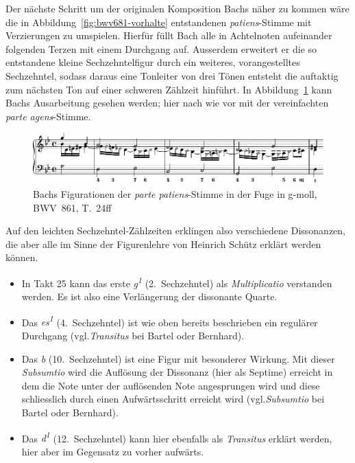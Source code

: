 Der nächste Schritt um der originalen Komposition Bachs näher zu kommen wäre die in Abbildung~\ref{fig:bwv681-vorhalte} entstandenen \emph{patiens}-Stimme mit Verzierungen zu umspielen.
Hierfür füllt Bach alle in Achtelnoten aufeinander folgenden Terzen mit einem Durchgang auf.
Ausserdem erweitert er die so entstandene kleine Sechzehntelfigur durch ein weiteres, vorangestelltes Sechzehntel, sodass daraus eine Tonleiter von drei Tönen entsteht die auftaktig zum nächsten Ton auf einer schweren Zählzeit hinführt.
In Abbildung~\ref{fig:bwv681-patiens-verziert} kann Bachs Ausarbeitung gesehen werden; hier nach wie vor mit der vereinfachten \emph{parte agens}-Stimme.

\begin{figure}[htbp]
	\centering
	\includegraphics{lilypond/g-moll/render/romanesca-patiens-verziert}
	\caption{Bachs Figurationen der \emph{parte patiens}-Stimme in der Fuge in g-moll, BWV~861, T.~24ff}
	\label{fig:bwv681-patiens-verziert}
\end{figure}

Auf den leichten Sechzehntel-Zählzeiten erklingen also verschiedene Dissonanzen, die aber alle im Sinne der Figurenlehre von Heinrich Schütz\autocite{bernhard:kompositionslehre} erklärt werden können.

\begin{itemize}
\item
	In Takt 25 kann das erste \emph{g\textsuperscript{1}} (2.~Sechzehntel) als \emph{Multiplicatio}\autocite[203f]{bartel:figurenlehre}\autocite[75]{bernhard:kompositionslehre} verstanden werden.
	Es ist also eine Verlängerung der dissonante Quarte.
\item
	Das \emph{es\textsuperscript{1}} (4.~Sechzehntel) ist wie oben bereits beschrieben ein regulärer Durchgang (vgl.\emph{Transitus} bei Bartel\autocite[260ff]{bartel:figurenlehre} oder Bernhard\autocite[64f]{bernhard:kompositionslehre}).
\item
	Das \emph{b} (10.~Sechzehntel) ist eine Figur mit besonderer Wirkung.
	Mit dieser \emph{Subsumtio} wird die Auflösung der Dissonanz (hier als Septime) erreicht in dem die Note unter der auflösenden Note angesprungen wird und diese schliesslich durch einen Aufwärtsschritt erreicht wird (vgl.\emph{Subsumtio} bei Bartel\autocite[242ff]{bartel:figurenlehre} oder Bernhard\autocite[148f]{bernhard:kompositionslehre}).
\item
	Das \emph{d\textsuperscript{1}} (12.~Sechzehntel) kann hier ebenfalls als \emph{Transitus} erklärt werden, hier aber im Gegensatz zu vorher aufwärts.
\end{itemize}

